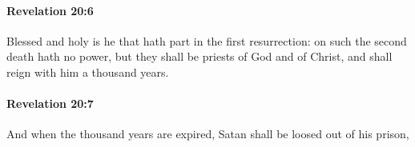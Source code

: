 		\paragraph{Revelation 20:6} %
			\label{REVELATIONNT-20-6}

			 Blessed and holy is he that hath part in the first resurrection: on such the second death hath no power, but they shall be priests of God and of Christ, and shall reign with him a thousand years.

			\begin{framed}
			\scriptsize
				\begin{compactdesc}
					\item[SBLG] 
				\end{compactdesc}
			\end{framed}

		\paragraph{Revelation 20:7} %
			\label{REVELATIONNT-20-7}

			And when the thousand years are expired, Satan shall be loosed out of his prison,

